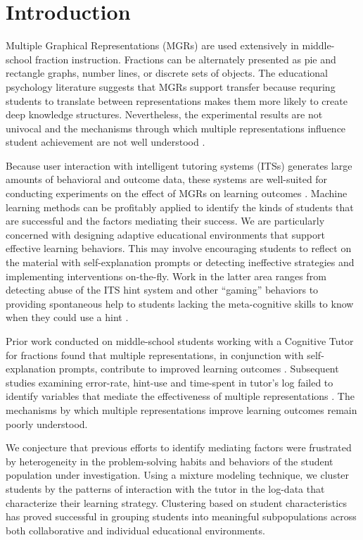 \documentclass{edm_template}
\begin{document}

\section{Introduction}
\label{sec:introduction}

Multiple Graphical Representations (MGRs) are used extensively in middle-school fraction instruction.  Fractions can be alternately presented as pie and rectangle graphs, number lines, or discrete sets of objects. The educational psychology literature suggests that MGRs support transfer because requring students to translate between representations makes them more likely to create deep knowledge structures. Nevertheless, the experimental results are not univocal \cite{Ainsworth1999} and the mechanisms through which multiple representations influence student achievement are not well understood \cite{Ainsworth2006}. 

Because user interaction with intelligent tutoring systems (ITSs) generates large amounts of behavioral and outcome data, these systems are well-suited for conducting experiments on the effect of MGRs on learning outcomes \cite{Newell1981}. Machine learning methods can be profitably applied to identify the kinds of students that are successful and the factors mediating their success. We are particularly concerned with designing adaptive educational environments that support effective learning behaviors. This may involve encouraging students to reflect on the material with self-explanation prompts \cite{Rau2009} or detecting ineffective strategies and implementing interventions on-the-fly. Work in the latter area ranges from detecting abuse of the ITS hint system and other ``gaming'' behaviors \cite{Baker2009} to providing spontaneous help to students lacking the meta-cognitive skills to know when they could use a hint \cite{Aleven2006}.

Prior work conducted on middle-school students working with a Cognitive Tutor for fractions found that multiple representations, in conjunction with self-explanation prompts, contribute to improved learning outcomes \cite{Rau2009}. Subsequent studies examining error-rate, hint-use and time-spent in tutor's log failed to identify variables that mediate the effectiveness of multiple representations \cite{Rau2012}. The mechanisms by which multiple representations improve learning outcomes remain poorly understood.

We conjecture that previous efforts to identify mediating factors were frustrated by heterogeneity in the problem-solving habits and behaviors of the student population under investigation. Using a mixture modeling technique, we cluster students by the patterns of interaction with the tutor in the log-data that characterize their learning strategy. Clustering based on student characteristics has proved successful in grouping students into meaningful subpopulations across both collaborative \cite{Perera2009} and individual \cite{Merceron2005} educational environments. 
\end{document}
